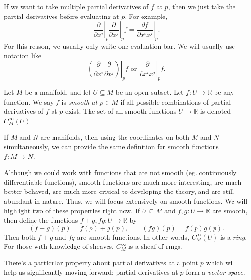 If we want to take multiple partial derivatives of $f$ at $p$, then we just take the partial derivatives before evaluating at $p$. For example,
\[
	\left.\frac{\partial }{\partial x^i} \right|_{p} \left. \frac{\partial }{\partial x^j} \right|_p f = \left.\frac{\partial f}{\partial x^ix^j} \right|_p
.\]
For this reason, we usually only write one evaluation bar. We will usually use notation like
\[
	\left.\left( \frac{\partial }{\partial x^i} \frac{\partial }{\partial x^j}  \right) \right|_pf \text{ or } \left. \frac{\partial }{\partial x^ix^j} \right|_p f
.\]


\begin{definition}\label{dfn:2-3}
	Let $M$ be a manifold, and let $U\subseteq M$ be an open subset. Let $f : U \to \mathbb{R} $ be any function. We say $f$ is \emph{smooth at $p\in M$} if all possible combinations of partial derivatives of $f$ at $p$ exist. The set of all smooth functions $U\to \mathbb{R} $ is denoted $C^\infty _M(U)$.

	If $M$ and $N$ are manifolds, then using the coordinates on both $M$ and $N$ simultaneously, we can provide the same definition for smooth functions $f : M \to N$.
\end{definition}

Although we could work with functions that are not smooth (eg. continuously differentiable functions), smooth functions are much more interesting, are much better behaved, are much more critical to developing the theory, and are still abundant in nature. Thus, we will focus extensively on smooth functions. We will highlight two of these properties right now. If $U\subseteq M$ and $f,g : U \to \mathbb{R} $ are smooth, then define the functions $f+g, fg : U \to \mathbb{R} $ by
\[
	(f+g)(p) = f(p) + g(p),\qquad (fg)(p) = f(p)g(p)
.\]
Then both $f+g$ and $fg$ are smooth functions. In other words, $C^\infty _M(U)$ is a \emph{ring}. For those with knowledge of sheaves, $C^\infty _M$ is a sheaf of rings.

There's a particular property about partial derivatives at a point $p$ which will help us significantly moving forward: partial derivatives at $p$ form a \emph{vector space}.

